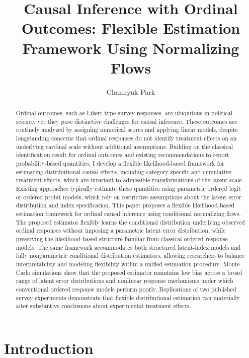 \documentclass{article}
\title{Causal Inference with Ordinal Outcomes: Flexible Estimation Framework Using Normalizing Flows}
\author{Chanhyuk Park}
\date{}
\begin{document}
    \maketitle

\begin{abstract}
  Ordinal outcomes, such as Likert-type survey responses, are ubiquitous in political science, yet they pose distinctive challenges for causal inference. These outcomes are routinely analyzed by assigning numerical scores and applying linear models, despite longstanding concerns that ordinal responses do not identify treatment effects on an underlying cardinal scale without additional assumptions. Building on the classical identification result for ordinal outcomes and existing recommendations to report probability-based quantities, I develop a flexible likelihood-based framework for estimating distributional causal effects, including category-specific and cumulative treatment effects, which are invariant to admissible transformations of the latent scale. Existing approaches typically estimate these quantities using parametric ordered logit or ordered probit models, which rely on restrictive assumptions about the latent error distribution and index specification.
  This paper proposes a flexible likelihood-based estimation framework for ordinal causal inference using conditional normalizing flows. The proposed estimator flexibly learns the conditional distribution underlying observed ordinal responses without imposing a parametric latent error distribution, while preserving the likelihood-based structure familiar from classical ordered response models. The same framework accommodates both structured latent-index models and fully nonparametric conditional distribution estimators, allowing researchers to balance interpretability and modeling flexibility within a unified estimation procedure.
  Monte Carlo simulations show that the proposed estimator maintains low bias across a broad range of latent error distributions and nonlinear response mechanisms under which conventional ordered response models perform poorly. Replications of two published survey experiments demonstrate that flexible distributional estimation can materially alter substantive conclusions about experimental treatment effects.
\end{abstract}

\newpage
\section{Introduction}
\label{sec:introduction}
\end{document}
